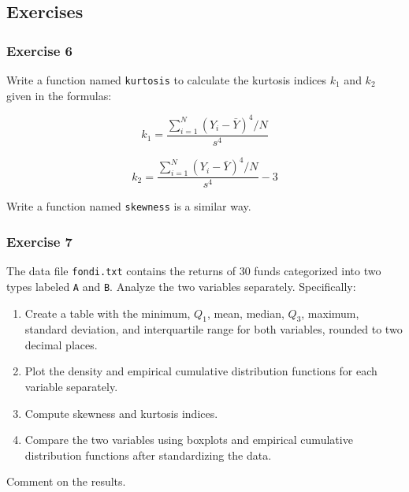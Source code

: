 \documentclass[
]{article}
\providecommand{\tightlist}{%
  \setlength{\itemsep}{0pt}\setlength{\parskip}{0pt}}
\begin{document}
\hypertarget{exercises}{%
\subsection{Exercises}\label{exercises}}

\hypertarget{exercise-6}{%
\subsubsection{Exercise 6}\label{exercise-6}}

Write a function named \texttt{kurtosis} to calculate the kurtosis
indices \(k_1\) and \(k_2\) given in the formulas:

\[
k_1 = \frac{\sum_{i=1}^N (Y_i - \bar{Y})^4 / N}{s^4}
\]

\[
k_2 = \frac{\sum_{i=1}^N (Y_i - \bar{Y})^4 / N}{s^4} - 3
\]

Write a function named \texttt{skewness} is a similar way.

\hypertarget{exercise-7}{%
\subsubsection{Exercise 7}\label{exercise-7}}

The data file \texttt{fondi.txt} contains the returns of 30 funds
categorized into two types labeled \texttt{A} and \texttt{B}. Analyze
the two variables separately. Specifically:

\begin{enumerate}
\def\labelenumi{\arabic{enumi}.}
\tightlist
\item
  Create a table with the minimum, \(Q_1\), mean, median, \(Q_3\),
  maximum, standard deviation, and interquartile range for both
  variables, rounded to two decimal places.
\item
  Plot the density and empirical cumulative distribution functions for
  each variable separately.
\item
  Compute skewness and kurtosis indices.
\item
  Compare the two variables using boxplots and empirical cumulative
  distribution functions after standardizing the data.
\end{enumerate}

Comment on the results.
\end{document}
